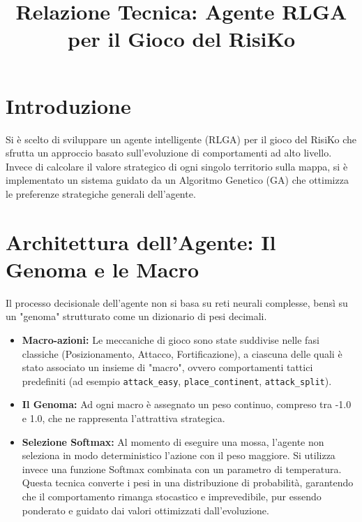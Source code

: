 \documentclass[12pt,a4paper]{article}
\title{Relazione Tecnica: Agente RLGA per il Gioco del RisiKo}
\author{}
\date{}
\begin{document}
\maketitle

\section{Introduzione}
Si è scelto di sviluppare un agente intelligente (RLGA) per il gioco del RisiKo che sfrutta un approccio basato sull'evoluzione di comportamenti ad alto livello. Invece di calcolare il valore strategico di ogni singolo territorio sulla mappa, si è implementato un sistema guidato da un Algoritmo Genetico (GA) che ottimizza le preferenze strategiche generali dell'agente.

\section{Architettura dell'Agente: Il Genoma e le Macro}
Il processo decisionale dell'agente non si basa su reti neurali complesse, bensì su un "genoma" strutturato come un dizionario di pesi decimali.
\begin{itemize}
    \item \textbf{Macro-azioni:} Le meccaniche di gioco sono state suddivise nelle fasi classiche (Posizionamento, Attacco, Fortificazione), a ciascuna delle quali è stato associato un insieme di "macro", ovvero comportamenti tattici predefiniti (ad esempio \texttt{attack\_easy}, \texttt{place\_continent}, \texttt{attack\_split}).
    \item \textbf{Il Genoma:} Ad ogni macro è assegnato un peso continuo, compreso tra -1.0 e 1.0, che ne rappresenta l'attrattiva strategica.
    \item \textbf{Selezione Softmax:} Al momento di eseguire una mossa, l'agente non seleziona in modo deterministico l'azione con il peso maggiore. Si utilizza invece una funzione Softmax combinata con un parametro di temperatura. Questa tecnica converte i pesi in una distribuzione di probabilità, garantendo che il comportamento rimanga stocastico e imprevedibile, pur essendo ponderato e guidato dai valori ottimizzati dall'evoluzione.
\end{itemize}
\end{document}
